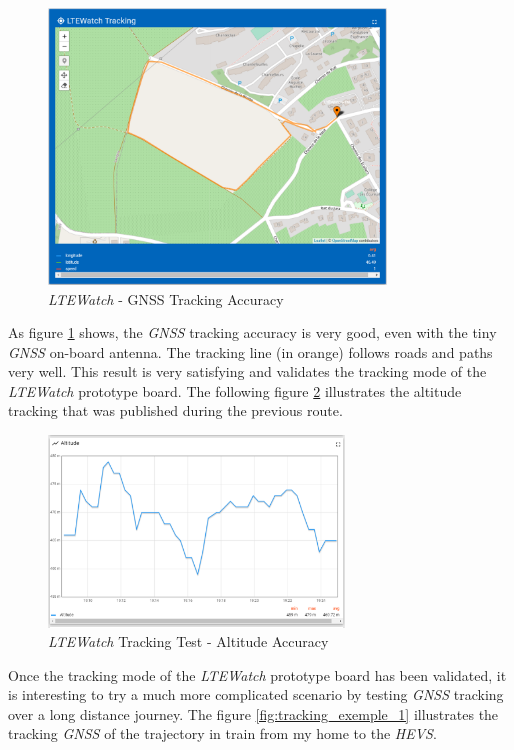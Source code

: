 \documentclass[Report.tex]{subfiles}
\begin{document}
\begin{figure}[H]
	\centering
	\includegraphics[width=0.8\textwidth]{Include/Figure/result/ltewatch_result_2.png}
	\caption{\textit{LTEWatch} - GNSS Tracking Accuracy}
	\label{fig:gnss_accuracy_1}
\end{figure}

As figure \ref{fig:gnss_accuracy_1} shows, the \textit{GNSS} tracking accuracy is very good, even with the tiny \textit{GNSS} on-board antenna. The tracking line (in orange) follows roads and paths very well. This result is very satisfying and validates the tracking mode of the \textit{LTEWatch} prototype board. The following figure \ref{fig:gnss_accuracy_2} illustrates the altitude tracking that was published during the previous route.

\begin{figure}[H]
	\centering
	\includegraphics[width=0.7\textwidth]{Include/Figure/result/ltewatch_result_1.png}
	\caption{\textit{LTEWatch} Tracking Test - Altitude Accuracy}
	\label{fig:gnss_accuracy_2}
\end{figure}

Once the tracking mode of the \textit{LTEWatch} prototype board has been validated, it is interesting to try a much more complicated scenario by testing \textit{GNSS} tracking over a long distance journey. The figure \ref{fig:tracking_exemple_1} illustrates the tracking \textit{GNSS} of the trajectory in train from my home to the \textit{HEVS}.
\end{document}
